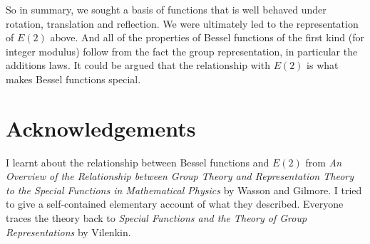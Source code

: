 \documentclass{article}
\begin{document}
So in summary, we sought a basis of functions that is well behaved under rotation, translation and reflection.
We were ultimately led to the representation of $E(2)$ above.
And all of the properties of Bessel functions of the first kind (for integer modulus) follow from the fact the group representation, in particular the additions laws.
It could be argued that the relationship with $E(2)$ is what makes Bessel functions special.

\section{Acknowledgements}
I learnt about the relationship between Bessel functions and $E(2)$ from \textit{An Overview of the Relationship between Group Theory and Representation Theory to the Special Functions in Mathematical Physics} by Wasson and Gilmore.
I tried to give a self-contained elementary account of what they described.
Everyone traces the theory back to \textit{Special Functions and the Theory of Group Representations} by Vilenkin.
\end{document}
